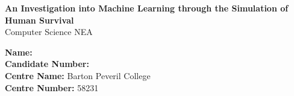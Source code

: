 \documentclass{article}
\begin{document}
\begin{titlepage}
    \begin{center}
        \vspace*{3cm}
        {\Huge \textbf{An Investigation into Machine Learning through the Simulation of Human Survival}} \\
        \vspace{1cm}
        {\Large Computer Science NEA}
        
        \vfill
        
        \large
        \textbf{Name:} \\
        \textbf{Candidate Number:} \\
        \vspace{0.2cm}
        \textbf{Centre Name:} Barton Peveril College\\
        \textbf{Centre Number:} 58231\\
        \pagebreak
    \end{center}
\end{titlepage}

\large

\setcounter{tocdepth}{5}
\tableofcontents










\end{document}
